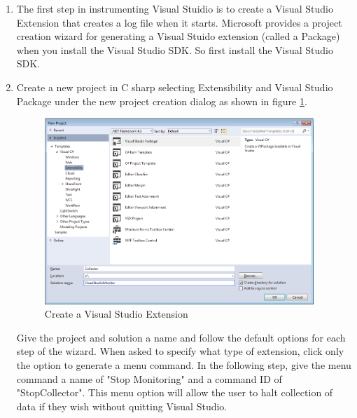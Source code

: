  \begin{Exercise}[type={program}, difficulty={1}]
\begin{enumerate}
\item
The first step in instrumenting Visual Stuidio is to create a Visual Studio Extension that creates a log file when it starts.   Microsoft provides a project creation wizard for generating a Visual Stuido extension (called a Package) when you install the Visual Studio SDK.  So first install the Visual Studio SDK.  

\item Create a new project in C sharp selecting Extensibility and Visual Studio Package under the new project creation dialog as shown in figure \ref{fig:ProjectCreation}.  
\begin{figure}
	\centering
	\includegraphics[width=4in]{Graphics/CreateVSIXExtension.png}
	\caption{Create a Visual Studio Extension}
	\label{fig:ProjectCreation}
\end{figure}

Give the project and solution a name and follow the default options for each step of the wizard.  When asked to specify what type of extension, click only the option to generate a menu command.  In the following step, give the menu command a name of "Stop Monitoring" and a command ID of "StopCollector".  This menu option will allow the user to halt collection of data if they wish without quitting Visual Studio.  
\end{enumerate}
\end{Exercise}

